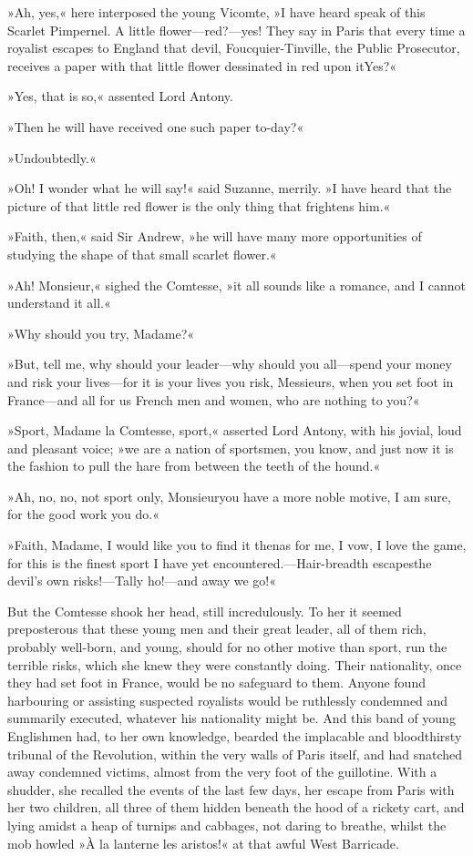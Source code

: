 »Ah, yes,« here interposed the young Vicomte, »I have heard speak of this Scarlet Pimpernel. A little flower—red?—yes! They say in Paris that every time a royalist escapes to England that devil, Foucquier-Tinville, the Public Prosecutor, receives a paper with that little flower dessinated in red upon it\textellipsis \allowbreak  Yes?«

»Yes, that is so,« assented Lord Antony.

»Then he will have received one such paper to-day?«

»Undoubtedly.«

»Oh! I wonder what he will say!« said Suzanne, merrily. »I have heard that the picture of that little red flower is the only thing that frightens him.«

»Faith, then,« said Sir Andrew, »he will have many more opportunities of studying the shape of that small scarlet flower.«

»Ah! Monsieur,« sighed the Comtesse, »it all sounds like a romance, and I cannot understand it all.«

»Why should you try, Madame?«

»But, tell me, why should your leader—why should you all—spend your money and risk your lives—for it is your lives you risk, Messieurs, when you set foot in France—and all for us French men and women, who are nothing to you?«

»Sport, Madame la Comtesse, sport,« asserted Lord Antony, with his jovial, loud and pleasant voice; »we are a nation of sportsmen, you know, and just now it is the fashion to pull the hare from between the teeth of the hound.«

»Ah, no, no, not sport only, Monsieur\textellipsis \allowbreak  you have a more noble motive, I am sure, for the good work you do.«

»Faith, Madame, I would like you to find it then\textellipsis \allowbreak  as for me, I vow, I love the game, for this is the finest sport I have yet encountered.—Hair-breadth escapes\textellipsis \allowbreak  the devil's own risks!—Tally ho!—and away we go!«

But the Comtesse shook her head, still incredulously. To her it seemed preposterous that these young men and their great leader, all of them rich, probably well-born, and young, should for no other motive than sport, run the terrible risks, which she knew they were constantly doing. Their nationality, once they had set foot in France, would be no safeguard to them. Anyone found harbouring or assisting suspected royalists would be ruthlessly condemned and summarily executed, whatever his nationality might be. And this band of young Englishmen had, to her own knowledge, bearded the implacable and bloodthirsty tribunal of the Revolution, within the very walls of Paris itself, and had snatched away condemned victims, almost from the very foot of the guillotine. With a shudder, she recalled the events of the last few days, her escape from Paris with her two children, all three of them hidden beneath the hood of a rickety cart, and lying amidst a heap of turnips and cabbages, not daring to breathe, whilst the mob howled »À la lanterne les aristos!« at that awful West Barricade.

